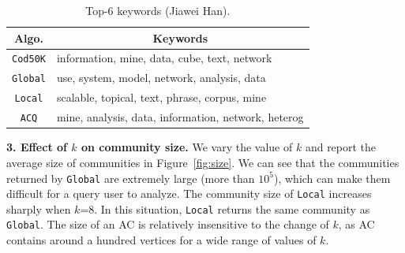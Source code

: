 \begin{table}[htp]
  \centering \footnotesize \caption {Top-6 keywords (Jiawei Han).}
  \label{tab:jiawei}
  \begin{tabular}{c|l}
     \hline
          \bf{Algo.}   & \multicolumn{1}{c}{\textbf{Keywords}}\\
     \hline\hline
          {\tt Cod50K} & information, mine, data, cube, text, network\\
     \hline
          {\tt Global} & use, system, model, network, analysis, data\\
     \hline
          {\tt Local}  & scalable, topical, text, phrase, corpus, mine\\
     \hline
          {\tt ACQ}    & mine, analysis, data, information, network, heterog\\
     \hline
  \end{tabular}
\end{table}



\textbf{3. Effect of $k$ on community size.}  We vary the value of $k$ and report the average size of communities in Figure~\ref{fig:size}. We can see that  the communities returned by {\tt Global} are extremely large (more than $10^5$), which can make them difficult for a query user to analyze. The community size of {\tt Local} increases sharply when $k$=8. In this situation, {\tt Local} returns the same community as {\tt Global}. The size of an AC is relatively insensitive to the change of $k$, as AC contains around a hundred vertices for a wide range of values of $k$.

